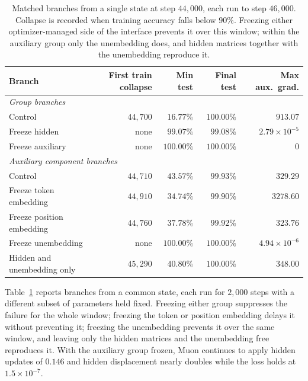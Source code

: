\documentclass{article}
\begin{document}
\begin{table}[t]
\centering
\small
\caption{Matched branches from a single state at step $44{,}000$, each run to step $46{,}000$. Collapse is recorded when training accuracy falls below $90\%$. Freezing either optimizer-managed side of the interface prevents it over this window; within the auxiliary group only the unembedding does, and hidden matrices together with the unembedding reproduce it.}
\label{tab:branches}
\begin{tabular}{lrrrr}
\toprule
Branch & First train collapse & Min test & Final test & Max aux.\ grad. \\
\midrule
\multicolumn{5}{l}{\emph{Group branches}} \\
Control & $44{,}700$ & $16.77\%$ & $100.00\%$ & $913.07$ \\
Freeze hidden & none & $99.07\%$ & $99.08\%$ & $2.79\times10^{-5}$ \\
Freeze auxiliary & none & $100.00\%$ & $100.00\%$ & $0$ \\
\midrule
\multicolumn{5}{l}{\emph{Auxiliary component branches}} \\
Control & $44{,}710$ & $43.57\%$ & $99.93\%$ & $329.29$ \\
Freeze token embedding & $44{,}910$ & $34.74\%$ & $99.90\%$ & $3278.60$ \\
Freeze position embedding & $44{,}760$ & $37.78\%$ & $99.92\%$ & $323.76$ \\
Freeze unembedding & none & $100.00\%$ & $100.00\%$ & $4.94\times10^{-6}$ \\
Hidden and unembedding only & $45{,}290$ & $40.80\%$ & $100.00\%$ & $348.00$ \\
\bottomrule
\end{tabular}
\end{table}

Table~\ref{tab:branches} reports branches from a common state, each run for $2{,}000$ steps with a different subset of parameters held fixed. Freezing either group suppresses the failure for the whole window; freezing the token or position embedding delays it without preventing it; freezing the unembedding prevents it over the same window, and leaving only the hidden matrices and the unembedding free reproduces it. With the auxiliary group frozen, Muon continues to apply hidden updates of $0.146$ and hidden displacement nearly doubles while the loss holds at $1.5\times10^{-7}$.
\end{document}
